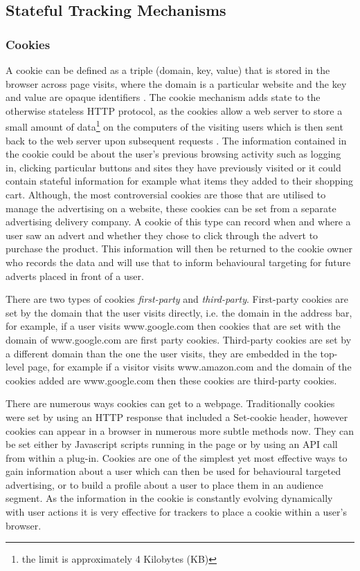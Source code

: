 \documentclass[12pt]{article}
\begin{document}
\subsection{Stateful Tracking Mechanisms}

\subsubsection {Cookies} \label{cookies}
A cookie can be defined as a triple (domain, key, value) that is stored in the browser across page visits, where the domain is a particular website and the key and value are opaque identifiers \parencite{roesner}. The cookie mechanism adds state to the otherwise stateless HTTP protocol, as the cookies allow a web server to store a small amount of data\footnote{ the limit is approximately 4 Kilobytes (KB)} on the computers of the visiting users which is then sent back to the web server upon subsequent requests \parencite{cookielessMonster}. The information contained in the cookie could be about the user's previous browsing activity such as logging in, clicking particular buttons and sites they have previously visited or it could contain stateful information for example what items they added to their shopping cart. Although, the most controversial cookies are those that are utilised to manage the advertising on a website, these cookies can be set from a separate advertising delivery company. A cookie of this type can record when and where a user saw an advert and whether they chose to click through the advert to purchase the product. This information will then be returned to the cookie owner who records the data and will use that to inform behavioural targeting for future adverts placed in front of a user.  \newline 

There are two types of cookies \textit{first-party} and \textit{third-party}. First-party cookies are set by the domain that the user visits directly, i.e. the domain in the address bar, for example, if a user visits www.google.com then cookies that are set with the domain of www.google.com are first party cookies. Third-party cookies are set by a different domain than the one the user visits, they are embedded in the top-level page, for example if a visitor visits www.amazon.com and the domain of the cookies added are www.google.com then these cookies are third-party cookies. \newline

There are numerous ways cookies can get to a webpage. Traditionally cookies were set by using an HTTP response that included a Set-cookie header, however cookies can appear in a browser in numerous more subtle methods now. They can be set either by Javascript scripts running in the page or by using an API call from within a plug-in. Cookies are one of the simplest yet most effective ways to gain information about a user which can then be used for behavioural targeted advertising, or to build a profile about a user to place them in an audience segment. As the information in the cookie is constantly evolving dynamically with user actions it is very effective for trackers to place a cookie within a user's browser. 
\end{document}
